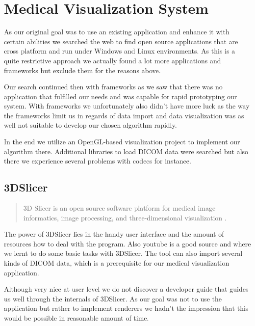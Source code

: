 \section{Medical Visualization System}

As our original goal was to use an existing application and enhance it with certain abilities we searched the web to find open source applications that are cross platform and run under Windows and Linux environments.
As this is a quite restrictive approach we actually found a lot more applications and frameworks but exclude them for the reasons above.

Our search continued then with frameworks as we saw that there was no application that fulfilled our needs and was capable for rapid prototyping our system.
With frameworks we unfortunately also didn't have more luck as the way the frameworks limit us in regards of data import and data visualization was as well not suitable to develop our chosen algorithm rapidly.

In the end we utilize an OpenGL-based visualization project to implement our algorithm there. Additional libraries to load DICOM data were searched but also there we experience several problems with codecs for instance.

%

\subsection{3DSlicer}

\blockquote{3D Slicer is an open source software platform for medical image informatics, image processing, and three-dimensional visualization \cite{3DSlicer_2018}.}

The power of 3DSlicer lies in the handy user interface and the amount of resources how to deal with the program. Also youtube is a good source and where we lernt to do some basic tasks with 3DSlicer. The tool can also import several kinds of DICOM data, which is a prerequisite for our medical visualization application.

Although very nice at user level we do not discover a developer guide that guides us well through the internals of 3DSlicer.
As our goal was not to use the application but rather to implement renderers we hadn't the impression that this would be possible in reasonable amount of time.

